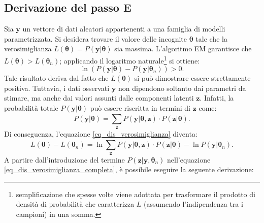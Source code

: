 \subsection{Derivazione del passo E}
Sia $\mathbf{y}$ un vettore di dati aleatori appartenenti a una famiglia di modelli parametrizzata. Si desidera trovare il valore delle incognite $\boldsymbol{\theta}$ tale che la verosimiglianza $L(\boldsymbol{\theta})=P(\mathbf{y} | \boldsymbol{\theta})$ sia massima. L'algoritmo EM garantisce che $L(\boldsymbol{\theta}) > L(\boldsymbol{\theta}_n)$; applicando il logaritmo naturale\footnote{semplificazione che spesse volte viene adottata per trasformare il prodotto di densità di probabilità che caratterizza $L$ (assumendo l'indipendenza tra i campioni) in una somma.} si ottiene:
\begin{equation}
	\ln(P(\mathbf{y}|\boldsymbol{\theta}) - P(\mathbf{y}|\boldsymbol{\theta}_n)) > 0.
	\label{eq_dis_verosimiglianza}
\end{equation}
Tale risultato deriva dal fatto che $L(\boldsymbol{\theta})$ si può dimostrare essere strettamente positiva. Tuttavia, i dati osservati $\mathbf{y}$ non dipendono soltanto dai parametri da stimare, ma anche dai valori assunti dalle componenti latenti $\mathbf{z}$. Infatti, la probabilità totale $P(\mathbf{y}|\boldsymbol{\theta})$ può essere riscritta in termini di $\mathbf{z}$ come:
\[
P(\mathbf{y}|\boldsymbol{\theta}) = \sum_{\mathbf{z}}^{}P(\mathbf{y}|\boldsymbol{\theta}, \mathbf{z})\cdot P(\mathbf{z}|\boldsymbol{\theta}).
\]
Di conseguenza, l'equazione \ref{eq_dis_verosimiglianza} diventa:
\begin{equation}
	L(\boldsymbol{\theta}) - L(\boldsymbol{\theta}_n) = \ln\sum_{\mathbf{z}}^{} P(\mathbf{y}|\boldsymbol{\theta}, \mathbf{z})\cdot P(\mathbf{z}|\boldsymbol{\theta}) - \ln P(\mathbf{y}|\boldsymbol{\theta}_n).
	\label{eq_dis_verosimiglianza_completa}
\end{equation}
A partire dall'introduzione del termine \textcolor{black}{$P(\mathbf{z}|\mathbf{y},\boldsymbol{\theta}_n)$} nell'equazione \ref{eq_dis_verosimiglianza_completa}, è possibile eseguire la seguente derivazione:
